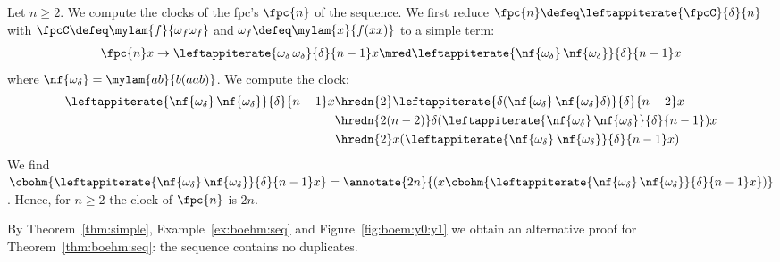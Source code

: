 \begin{example}\label{ex:boehm:seq}
  Let $n \geq 2$.
  We compute the clocks of the fpc's 
  $\fpc{n}$ of the \boehm{} sequence.
We first reduce $\fpc{n} \defeq \leftappiterate{\fpcC}{\delta}{n}$
  with $\fpcC \defeq \mylam{f}{\omega_{f}\omega_{f}}$
  and $\omega_f \defeq \mylam{x}{f(xx)}$ to a simple term:
  \begin{align*}
    \fpc{n} x
    \to \leftappiterate{\omega_\delta \, \omega_\delta}{\delta}{n-1} x
    \mred \leftappiterate{\nf{\omega_\delta} \, \nf{\omega_\delta}}{\delta}{n-1} x
  \end{align*}
  where $\nf{\omega_\delta} = \mylam{ab}{b(aab)}$.
  We compute the clock:
  \begin{align*}
    \leftappiterate{\nf{\omega_\delta} \, \nf{\omega_\delta}}{\delta}{n-1} x
    & \hredn{2} \leftappiterate{\delta (\nf{\omega_\delta} \, \nf{\omega_\delta} \delta)}{\delta}{n-2} x
    \\
    & \hredn{2(n-2)} \delta (\leftappiterate{\nf{\omega_\delta} \, \nf{\omega_\delta}}{\delta}{n-1}) x
    \\
    & \hredn{2} x (\leftappiterate{\nf{\omega_\delta} \, \nf{\omega_\delta}}{\delta}{n-1} x) 
  \end{align*}
  We find 
  $\cbohm{\leftappiterate{\nf{\omega_\delta} \, \nf{\omega_\delta}}{\delta}{n-1} x} 
   = \annotate{2n}{(x \cbohm{\leftappiterate{\nf{\omega_\delta} \, \nf{\omega_\delta}}{\delta}{n-1} x})}$.
  Hence, for $n \geq 2$ the clock of $\fpc{n}$ is $2n$.
\end{example}
\noindent
By Theorem~\ref{thm:simple}, Example~\ref{ex:boehm:seq}
and Figure~\ref{fig:boem:y0:y1} we obtain an alternative 
proof for Theorem~\ref{thm:boehm:seq}: the \boehm{} sequence contains no duplicates.

